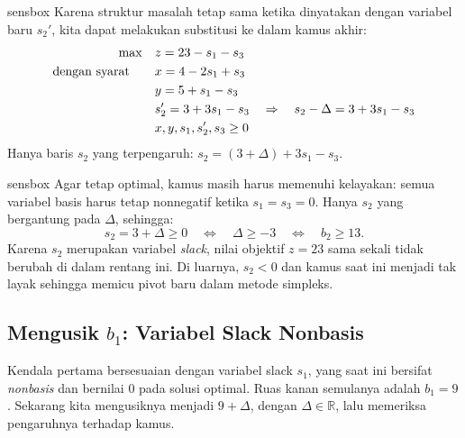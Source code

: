 \begin{steppanel}{sensbox}
Karena struktur masalah tetap sama ketika dinyatakan dengan variabel baru \( s_2' \), kita dapat melakukan substitusi ke dalam kamus akhir:
\[
\begin{aligned}
\max \quad
& z = 23 - s_1 - s_3 \\
\mbox{dengan syarat}\quad \quad
& x = 4 - 2s_1 + s_3 \\
& y = 5 + s_1 - s_3 \\
& s_2'  = 3 + 3s_1 - s_3
\quad \Rightarrow \quad
s_2 - \Delta = 3  + 3s_1 - s_3 \\
& x, y, s_1, s_2', s_3 \geq 0
\end{aligned}
\]
Hanya baris \( s_2 \) yang terpengaruh: \( s_2 = (3 + \Delta) + 3s_1 - s_3 \).
\end{steppanel}

\begin{steppanel}{sensbox}
Agar tetap optimal, kamus masih harus memenuhi kelayakan: semua variabel basis harus tetap nonnegatif ketika \( s_1 = s_3 = 0 \). Hanya \( s_2 \) yang bergantung pada \( \Delta \), sehingga:
\[
s_2 = 3 + \Delta \geq 0
\quad\Longleftrightarrow\quad
\boxed{\Delta \geq -3}
\quad\Longleftrightarrow\quad
b_2 \geq 13.
\]
Karena \( s_2 \) merupakan variabel \emph{slack}, nilai objektif \( z = 23 \) sama sekali tidak berubah di dalam rentang ini. Di luarnya, \( s_2 < 0 \) dan kamus saat ini menjadi tak layak sehingga memicu pivot baru dalam metode simpleks.
\end{steppanel}

\subsection{Mengusik \( b_1 \): Variabel Slack Nonbasis}

Kendala pertama bersesuaian dengan variabel slack \( s_1 \), yang saat ini bersifat \emph{nonbasis} dan bernilai 0 pada solusi optimal. Ruas kanan semulanya adalah \( b_1 = 9 \). Sekarang kita mengusiknya menjadi \( 9 + \Delta \), dengan \( \Delta \in \mathbb{R} \), lalu memeriksa pengaruhnya terhadap kamus.

